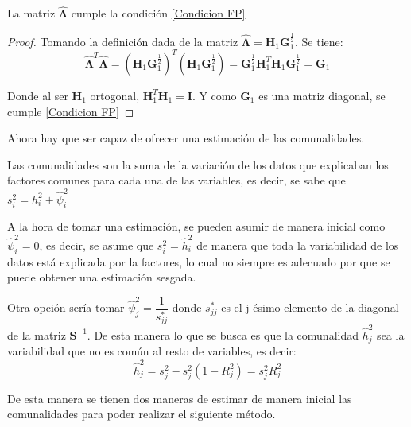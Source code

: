 \begin{propo}
La matriz $\mathbf{\hat{\mathbf{\Lambda}}}$ cumple la condición \eqref{Condicion FP}
\begin{proof}
Tomando la definición dada de la matriz $\mathbf{\hat{\mathbf{\Lambda}}}=\textbf{H}_1\textbf{G}_1^{\frac{1}{2}}$. Se tiene:
\begin{equation}
\mathbf{\hat{\mathbf{\Lambda}}}^T \mathbf{\hat{\mathbf{\Lambda}}}=(\textbf{H}_1\textbf{G}_1^{\frac{1}{2}})^T(\textbf{H}_1\textbf{G}_1^{\frac{1}{2}})= \textbf{G}_1^{\frac{1}{2}}\textbf{H}_1^T\textbf{H}_1\textbf{G}_1^{\frac{1}{2}}=\textbf{G}_1
\end{equation}

\noindent Donde al ser $\textbf{H}_1$ ortogonal, $\textbf{H}_1^T\textbf{H}_1=\textbf{I}$. Y como $\textbf{G}_1$ es una matriz diagonal, se cumple \eqref{Condicion FP}\qedhere
\end{proof}
\end{propo}

\noindent Ahora hay que ser capaz de ofrecer una estimación de las comunalidades.

\noindent Las comunalidades son  la suma de la variación de los datos que explicaban los factores comunes para cada una de las variables, es decir, se sabe que $s^2_i=h_i^2+\hat{\psi}_i^2$

\noindent A la hora de tomar una estimación, se pueden asumir de manera inicial como $\hat{\psi}_i^2=0$, es decir, se asume que $s^2_i=\hat{h}_i^2$ de manera que toda la variabilidad de los datos está explicada por la factores, lo cual no siempre es adecuado por que se puede obtener una estimación sesgada.  

\noindent Otra opción sería tomar $\hat{\psi}_j^2=\dfrac{1}{s^{*}_{jj}}$ donde $s^{*}_{jj}$ es el j-ésimo elemento de la diagonal de la matriz $\textbf{S}^{-1}$. De esta manera lo que se busca es que la comunalidad $\hat{h}_j^2$ sea la variabilidad que no es común al resto de variables, es decir:
\begin{equation}
\hat{h}_j^2=s_j^2-s_j^2(1-R_j^2)=s_j^2R_j^2
\end{equation}
 
\noindent De esta manera se tienen dos maneras de estimar de manera inicial las comunalidades para poder realizar el siguiente método.
